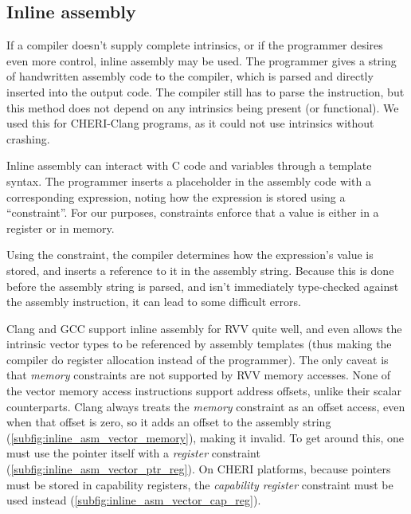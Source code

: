 \documentclass[../thesis]{subfiles}
\begin{document}

\subsection{Inline assembly}
If a compiler doesn't supply complete intrinsics, or if the programmer desires even more control, inline assembly may be used.
The programmer gives a string of handwritten assembly code to the compiler, which is parsed and directly inserted into the output code.
The compiler still has to parse the instruction, but this method does not depend on any intrinsics being present (or functional).
We used this for CHERI-Clang programs, as it could not use intrinsics without crashing.

Inline assembly can interact with C code and variables through a template syntax.
The programmer inserts a placeholder in the assembly code with a corresponding expression, noting how the expression is stored using a \enquote{constraint}.
For our purposes, constraints enforce that a value is either in a register or in memory.

Using the constraint, the compiler determines how the expression's value is stored, and inserts a reference to it in the assembly string.
Because this is done before the assembly string is parsed, and isn't immediately type-checked against the assembly instruction, it can lead to some difficult errors.

Clang and GCC support inline assembly for RVV quite well, and even allows the intrinsic vector types to be referenced by assembly templates (thus making the compiler do register allocation instead of the programmer).
The only caveat is that \emph{memory} constraints are not supported by RVV memory accesses.
None of the vector memory access instructions support address offsets, unlike their scalar counterparts.
Clang always treats the \emph{memory} constraint as an offset access, even when that offset is zero, so it adds an offset to the assembly string (\cref{subfig:inline_asm_vector_memory}), making it invalid.
To get around this, one must use the pointer itself with a \emph{register} constraint (\cref{subfig:inline_asm_vector_ptr_reg}).
On CHERI platforms, because pointers must be stored in capability registers, the \emph{capability register} constraint must be used instead (\cref{subfig:inline_asm_vector_cap_reg}).
\end{document}
